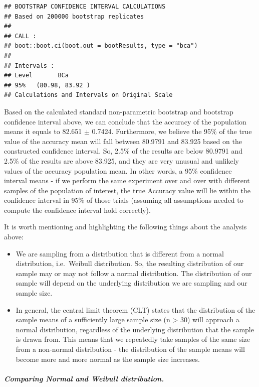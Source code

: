 \documentclass[
]{article}
\providecommand{\tightlist}{%
  \setlength{\itemsep}{0pt}\setlength{\parskip}{0pt}}
\begin{document}
\begin{verbatim}
## BOOTSTRAP CONFIDENCE INTERVAL CALCULATIONS
## Based on 200000 bootstrap replicates
## 
## CALL : 
## boot::boot.ci(boot.out = bootResults, type = "bca")
## 
## Intervals : 
## Level       BCa          
## 95%   (80.98, 83.92 )  
## Calculations and Intervals on Original Scale
\end{verbatim}

Based on the calculated standard non-parametric bootstrap and bootstrap confidence interval above, we can conclude that the accuracy of the population means it equals to 82.651 \(\pm\) 0.7424. Furthermore, we believe the 95\% of the true value of the accuracy mean will fall between 80.9791 and 83.925 based on the constructed confidence interval. So, 2.5\% of the results are below 80.9791 and 2.5\% of the results are above 83.925, and they are very unusual and unlikely values of the accuracy population mean. In other words, a 95\% confidence interval means - if we perform the same experiment over and over with different samples of the population of interest, the true Accuracy value will lie within the confidence interval in 95\% of those trials (assuming all assumptions needed to compute the confidence interval hold correctly).

It is worth mentioning and highlighting the following things about the analysis above:

\begin{itemize}
\tightlist
\item
  We are sampling from a distribution that is different from a normal distribution, i.e.~Weibull distribution. So, the resulting distribution of our sample may or may not follow a normal distribution. The distribution of our sample will depend on the underlying distribution we are sampling and our sample size.
\item
  In general, the central limit theorem (CLT) states that the distribution of the sample means of a sufficiently large sample size (n \textgreater{} 30) will approach a normal distribution, regardless of the underlying distribution that the sample is drawn from. This means that we repeatedly take samples of the same size from a non-normal distribution - the distribution of the sample means will become more and more normal as the sample size increases.
\end{itemize}

\hypertarget{comparing-normal-and-weibull-distribution.}{%
\subparagraph{Comparing Normal and Weibull distribution.}\label{comparing-normal-and-weibull-distribution.}}
\end{document}
